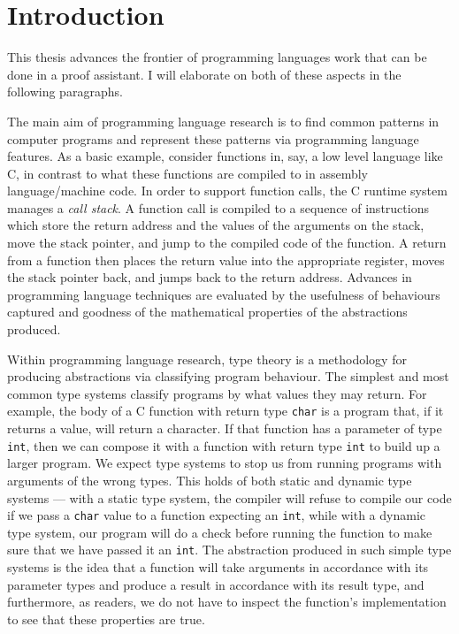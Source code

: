 \chapter{Introduction}

This thesis advances the frontier of programming languages work that can be done
in a proof assistant.
I will elaborate on both of these aspects in the following paragraphs.

The main aim of programming language research is to find common patterns in
computer programs and represent these patterns via programming language
features.
As a basic example, consider functions in, say, a low level language like C, in
contrast to what these functions are compiled to in assembly language/machine
code.
In order to support function calls, the C runtime system manages a
\emph{call stack}.
A function call is compiled to a sequence of instructions which store the return
address and the values of the arguments on the stack, move the stack pointer,
and jump to the compiled code of the function.
A return from a function then places the return value into the appropriate
register, moves the stack pointer back, and jumps back to the return address.
Advances in programming language techniques are evaluated by the usefulness of
behaviours captured and goodness of the mathematical properties of the
abstractions produced.

Within programming language research, type theory is a methodology for producing
abstractions via classifying program behaviour.
The simplest and most common type systems classify programs by what values they
may return.
For example, the body of a C function with return type \texttt{char} is a
program that, if it returns a value, will return a character.
If that function has a parameter of type \texttt{int}, then we can compose it
with a function with return type \texttt{int} to build up a larger program.
We expect type systems to stop us from running programs with arguments of the
wrong types.
This holds of both static and dynamic type systems --- with a static type
system, the compiler will refuse to compile our code if we pass a \texttt{char}
value to a function expecting an \texttt{int}, while with a dynamic type system,
our program will do a check before running the function to make sure that we
have passed it an \texttt{int}.
The abstraction produced in such simple type systems is the idea that a function
will take arguments in accordance with its parameter types and produce a result
in accordance with its result type, and furthermore, as readers, we do not have
to inspect the function's implementation to see that these properties are true.

